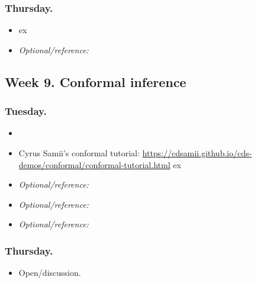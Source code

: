 \documentclass[letterpaper, 12pt, parskip=full,DIV=10]{scrartcl}
\begin{document}
\subsubsection*{Thursday.}

\begin{itemize}
\item {}  ex
\item  \textit{Optional/reference:}  
\end{itemize}

\subsection*{Week 9. Conformal inference}





\subsubsection*{Tuesday.}
\begin{itemize}
\item {} 
\item Cyrus Samii's conformal tutorial: \url{https://cdsamii.github.io/cds-demos/conformal/conformal-tutorial.html}  ex
\item  \textit{Optional/reference:}  
\item  \textit{Optional/reference:}  
\item  \textit{Optional/reference:}  
\end{itemize}


\subsubsection*{Thursday.}

\begin{itemize}
\item Open/discussion.
\end{itemize}
\end{document}
